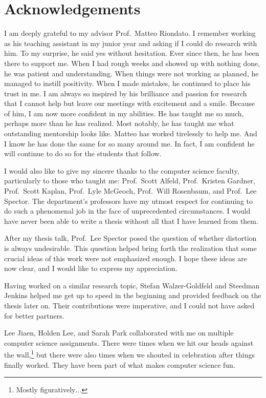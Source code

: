 \chapter*{Acknowledgements}

I am deeply grateful to my advisor Prof.\ Matteo Riondato. I remember working as
his teaching assistant in my junior year and asking if I could do research with
him. To my surprise, he said yes without hesitation. Ever since then, he has
been there to support me. When I had rough weeks and showed up with nothing
done, he was patient and understanding. When things were not working as planned,
he managed to instill positivity. When I made mistakes, he continued to place
his trust in me. I am always so inspired by his brilliance and passion for
research that I cannot help but leave our meetings with excitement and a smile.
Because of him, I am now more confident in my abilities. He has taught me so
much, perhaps more than he has realized. Most notably, he has taught me what
outstanding mentorship looks like. Matteo has worked tirelessly to help me. And
I know he has done the same for so many around me. In fact, I am confident he
will continue to do so for the students that follow.

I would also like to give my sincere thanks to the computer science faculty,
particularly to those who taught me: Prof.\ Scott Alfeld, Prof.\ Kristen
Gardner, Prof.\ Scott Kaplan, Prof.\ Lyle McGeoch, Prof.\ Will Rosenbaum, and
Prof.\ Lee Spector. The department's professors have my utmost respect for
continuing to do such a phenomenal job in the face of unprecedented
circumstances. I would have never been able to write a thesis without all that I
have learned from them.

After my thesis talk, Prof.\ Lee Spector posed the question of whether
distortion is always undesirable. This question helped bring forth the
realization that some crucial ideas of this work were not emphasized enough. I
hope these ideas are now clear, and I would like to express my appreciation.

Having worked on a similar research topic, Stefan Walzer-Goldfeld and Steedman
Jenkins helped me get up to speed in the beginning and provided feedback on the
thesis later on. Their contributions were imperative, and I could not have asked
for better partners.

Lee Jiaen, Holden Lee, and Sarah Park collaborated with me on multiple computer
science assignments. There were times when we hit our heads against the
wall,\footnote{Mostly figuratively$\ldots$} but there were also times when we
shouted in celebration after things finally worked. They have been part of what
makes computer science fun.

